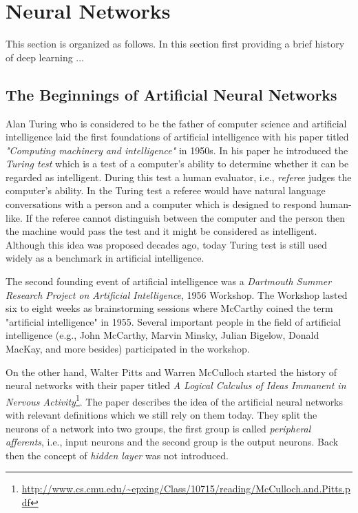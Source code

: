 \setcounter{secnumdepth}{4}
\section{Neural Networks}  \label{cha:foundations_basics_nn}
This section is organized as follows. In this section first providing a brief history of deep learning ...
\subsection{The Beginnings of Artificial Neural Networks}
Alan Turing who is considered to be the father of computer science and artificial intelligence laid the first foundations of artificial intelligence with his paper titled \textit{"Computing machinery and intelligence"} in 1950s. In his paper he introduced the \textit{Turing test} which is a test of a computer's ability to determine whether it can be regarded as intelligent. During this test a human evaluator, i.e., \textit{referee} judges the computer's ability. 
In the Turing test a referee would have natural language conversations with a person and a computer which is designed to respond human-like. If the referee cannot distinguish between the computer and the person then the machine would pass the test and it might be considered as intelligent. Although this idea was proposed decades ago, today Turing test is still used widely as a benchmark in artificial intelligence. 

The second founding event of artificial intelligence was a \textit{Dartmouth Summer Research Project on Artificial Intelligence}, 1956 Workshop. The Workshop lasted six to eight weeks as brainstorming sessions where McCarthy coined the term "artificial intelligence" in 1955. Several important people in the field of artificial intelligence (e.g., John McCarthy, Marvin Minsky, Julian Bigelow, Donald MacKay, and more besides) participated in the workshop.

On the other hand, Walter Pitts and Warren McCulloch started the history of neural networks with their paper titled \textit{A Logical Calculus of Ideas Immanent in Nervous Activity}\footnote{\url{http://www.cs.cmu.edu/~epxing/Class/10715/reading/McCulloch.and.Pitts.pdf}}.  The paper describes the idea of the artificial neural networks with relevant definitions which we still rely on them today. They split the neurons of a network into two groups, the first group is called \textit{peripheral afferents}, i.e., input neurons and the second group is the output neurons. Back then the concept of \textit{hidden layer} was not introduced. 

